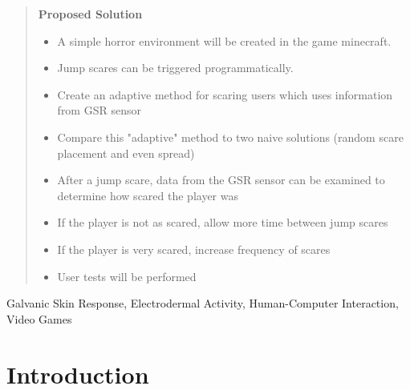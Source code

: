 \documentclass[12pt,a4paper]{article}
\begin{document}
\begin{abstract}
\textbf{Proposed Solution}
	\begin{itemize}
		\item A simple horror environment will be created in the game minecraft.
		\item Jump scares can be triggered programmatically.
		\item Create an adaptive method for scaring users which uses information from GSR sensor
		\item Compare this "adaptive" method to two naive solutions (random scare placement and even spread)
		\item After a jump scare, data from the GSR sensor can be examined to determine how scared the player was
		\item If the player is not as scared, allow more time between jump scares
		\item If the player is very scared, increase frequency of scares
		\item User tests will be performed
	\end{itemize}

\end{abstract}

\begin{keywords}
Galvanic Skin Response, Electrodermal Activity, Human-Computer Interaction, Video Games
\end{keywords}

\section{Introduction}

\end{document}
